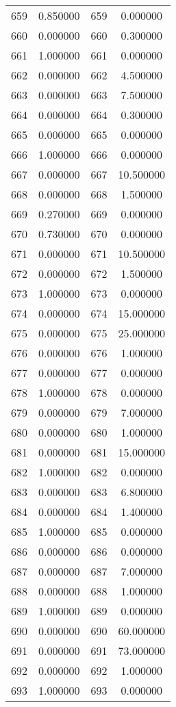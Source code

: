 \documentclass[12pt]{article}
\begin{document}
\begin{longtable}{@{}cccc@{}}
659 & 0.850000 & 659 & 0.000000 \\
660 & 0.000000 & 660 & 0.300000 \\
661 & 1.000000 & 661 & 0.000000 \\
662 & 0.000000 & 662 & 4.500000 \\
663 & 0.000000 & 663 & 7.500000 \\
664 & 0.000000 & 664 & 0.300000 \\
665 & 0.000000 & 665 & 0.000000 \\
666 & 1.000000 & 666 & 0.000000 \\
667 & 0.000000 & 667 & 10.500000 \\
668 & 0.000000 & 668 & 1.500000 \\
669 & 0.270000 & 669 & 0.000000 \\
670 & 0.730000 & 670 & 0.000000 \\
671 & 0.000000 & 671 & 10.500000 \\
672 & 0.000000 & 672 & 1.500000 \\
673 & 1.000000 & 673 & 0.000000 \\
674 & 0.000000 & 674 & 15.000000 \\
675 & 0.000000 & 675 & 25.000000 \\
676 & 0.000000 & 676 & 1.000000 \\
677 & 0.000000 & 677 & 0.000000 \\
678 & 1.000000 & 678 & 0.000000 \\
679 & 0.000000 & 679 & 7.000000 \\
680 & 0.000000 & 680 & 1.000000 \\
681 & 0.000000 & 681 & 15.000000 \\
682 & 1.000000 & 682 & 0.000000 \\
683 & 0.000000 & 683 & 6.800000 \\
684 & 0.000000 & 684 & 1.400000 \\
685 & 1.000000 & 685 & 0.000000 \\
686 & 0.000000 & 686 & 0.000000 \\
687 & 0.000000 & 687 & 7.000000 \\
688 & 0.000000 & 688 & 1.000000 \\
689 & 1.000000 & 689 & 0.000000 \\
690 & 0.000000 & 690 & 60.000000 \\
691 & 0.000000 & 691 & 73.000000 \\
692 & 0.000000 & 692 & 1.000000 \\
693 & 1.000000 & 693 & 0.000000 \\

\end{longtable}
\end{document}
